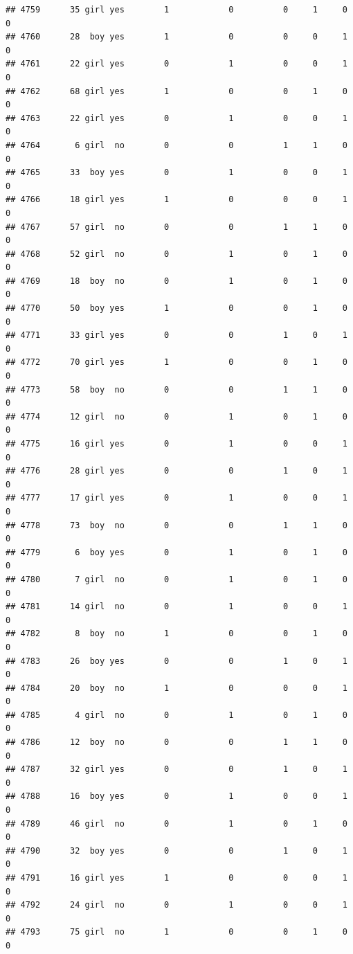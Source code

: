 \documentclass[man]{apa6}
\begin{document}
\begin{verbatim}
## 4759      35 girl yes        1            0          0     1     0     0
## 4760      28  boy yes        1            0          0     0     1     0
## 4761      22 girl yes        0            1          0     0     1     0
## 4762      68 girl yes        1            0          0     1     0     0
## 4763      22 girl yes        0            1          0     0     1     0
## 4764       6 girl  no        0            0          1     1     0     0
## 4765      33  boy yes        0            1          0     0     1     0
## 4766      18 girl yes        1            0          0     0     1     0
## 4767      57 girl  no        0            0          1     1     0     0
## 4768      52 girl  no        0            1          0     1     0     0
## 4769      18  boy  no        0            1          0     1     0     0
## 4770      50  boy yes        1            0          0     1     0     0
## 4771      33 girl yes        0            0          1     0     1     0
## 4772      70 girl yes        1            0          0     1     0     0
## 4773      58  boy  no        0            0          1     1     0     0
## 4774      12 girl  no        0            1          0     1     0     0
## 4775      16 girl yes        0            1          0     0     1     0
## 4776      28 girl yes        0            0          1     0     1     0
## 4777      17 girl yes        0            1          0     0     1     0
## 4778      73  boy  no        0            0          1     1     0     0
## 4779       6  boy yes        0            1          0     1     0     0
## 4780       7 girl  no        0            1          0     1     0     0
## 4781      14 girl  no        0            1          0     0     1     0
## 4782       8  boy  no        1            0          0     1     0     0
## 4783      26  boy yes        0            0          1     0     1     0
## 4784      20  boy  no        1            0          0     0     1     0
## 4785       4 girl  no        0            1          0     1     0     0
## 4786      12  boy  no        0            0          1     1     0     0
## 4787      32 girl yes        0            0          1     0     1     0
## 4788      16  boy yes        0            1          0     0     1     0
## 4789      46 girl  no        0            1          0     1     0     0
## 4790      32  boy yes        0            0          1     0     1     0
## 4791      16 girl yes        1            0          0     0     1     0
## 4792      24 girl  no        0            1          0     0     1     0
## 4793      75 girl  no        1            0          0     1     0     0

\end{verbatim}
\end{document}
